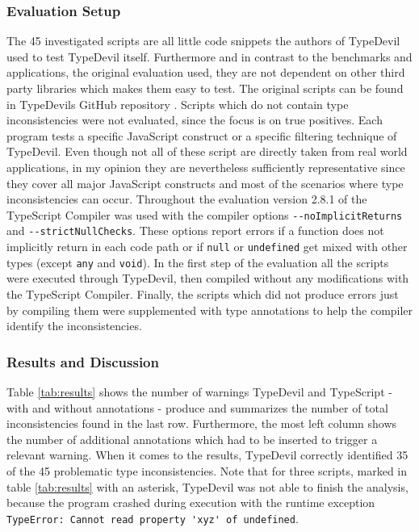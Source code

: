 \documentclass[runningheads,a4paper]{llncs}
\begin{document}
\subsubsection{Evaluation Setup}
The 45 investigated scripts are all little code snippets the authors of TypeDevil used to test TypeDevil itself. 
Furthermore and in contrast to the benchmarks and applications, the original evaluation used, they are not dependent on other third party libraries which makes them easy to test.
The original scripts can be found in TypeDevils GitHub repository \cite{TypeDevilGitHubTests}.
Scripts which do not contain type inconsistencies were not evaluated, since the focus is on true positives.
Each program tests a specific JavaScript construct or a specific filtering technique of TypeDevil.
Even though not all of these script are directly taken from real world applications, in my opinion they are nevertheless sufficiently representative since they cover all major JavaScript constructs and most of the scenarios where type inconsistencies can occur.
Throughout the evaluation version 2.8.1 of the TypeScript Compiler was used with the compiler options \lstinline[columns=fixed]{--noImplicitReturns} and \lstinline[columns=fixed]{--strictNullChecks}.
These options report errors if a function does not implicitly return in each code path or if \lstinline[columns=fixed]{null} or \lstinline[columns=fixed]{undefined} get mixed with other types (except \lstinline[columns=fixed]{any} and \lstinline[columns=fixed]{void}).
In the first step of the evaluation all the scripts were executed through TypeDevil, then compiled without any modifications with the TypeScript Compiler.
Finally, the scripts which did not produce errors just by compiling them were supplemented with type annotations to help the compiler identify the inconsistencies.


\subsubsection{Results and Discussion}
Table \ref{tab:results} shows the number of warnings TypeDevil and TypeScript - with and without annotations - produce and summarizes the number of total inconsistencies found in the last row.
Furthermore, the most left column shows the number of additional annotations which had to be inserted to trigger a relevant warning.
When it comes to the results, TypeDevil correctly identified 35 of the 45 problematic type inconsistencies.
Note that for three scripts, marked in table \ref{tab:results} with an asterisk, TypeDevil was not able to finish the analysis, because the program crashed during execution with the runtime exception \lstinline[columns=fixed]{TypeError: Cannot read property 'xyz' of undefined}.
\end{document}

